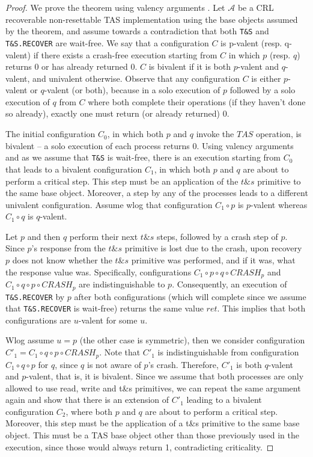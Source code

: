 \begin{proof}
	We prove the theorem using valency arguments \cite{DBLP:journals/jacm/FischerLP85}. Let $\mathcal{A}$ be a CRL recoverable non-resettable TAS implementation using the base objects assumed by the theorem, and assume towards a contradiction that both \texttt{T\&S} and \texttt{T\&S.RECOVER} are wait-free. We say that a configuration $C$ is p-valent (resp. q-valent) if there exists a crash-free execution starting from $C$ in which $p$ (resp. $q$) returns 0 or has already returned $0$. $C$ is bivalent if it is both $p$-valent and $q$-valent, and univalent otherwise. Observe that any configuration $C$ is either $p$-valent or $q$-valent (or both), because in a solo execution of $p$ followed by a solo execution of $q$ from $C$ where both complete their operations (if they haven't done so already), exactly one must return (or already returned) 0.
	
	The initial configuration $C_0$, in which both $p$ and $q$ invoke the $TAS$ operation, is bivalent -- a solo execution of each process returns 0. Using valency arguments and as we assume that \texttt{T\&S} is wait-free, there is an execution starting from $C_0$ that leads to a bivalent configuration $C_1$, in which both $p$ and $q$ are about to perform a critical step. This step must be an application of the $t\&s$ primitive to the same base object. Moreover, a step by any of the processes leads to a different univalent configuration. Assume wlog that configuration $C_1 \circ p$ is $p$-valent whereas $C_1 \circ q$ is $q$-valent.
	
	Let $p$ and then $q$ perform their next $t\&s$ steps, followed by a crash step of $p$. Since $p$'s response from the $t\&s$ primitive is lost due to the crash, upon recovery $p$ does not know whether the $t\&s$ primitive was performed, and if it was, what the response value was. Specifically, configurations $C_1 \circ p \circ q \circ CRASH_p$ and $C_1 \circ q \circ p \circ CRASH_p$ are indistinguishable to $p$. Consequently, an execution of \texttt{T\&S.RECOVER} by $p$ after both configurations (which will complete since we assume that \texttt{T\&S.RECOVER} is wait-free) returns the same value $ret$. This implies that both configurations are $u$-valent for some $u$.
	
	Wlog assume $u=p$ (the other case is symmetric), then we consider configuration $C'_1=C_1 \circ q \circ p \circ CRASH_p$. Note that $C'_1$ is indistinguishable from configuration $C_1 \circ q \circ p$ for $q$, since $q$ is not aware of $p$'s crash. Therefore, $C'_1$ is both $q$-valent and $p$-valent, that is, it is bivalent. Since we assume that both processes are only allowed to use read, write and t\&s primitives, we can repeat the same argument again and show that there is an extension of $C'_1$ leading to a bivalent configuration $C_2$, where both $p$ and $q$ are about to perform a critical step. Moreover, this step must be the application of a t\&s primitive to the same base object. This must be a TAS base object other than those previously used in the execution, since those would always return 1, contradicting criticality.
	

\end{proof}

